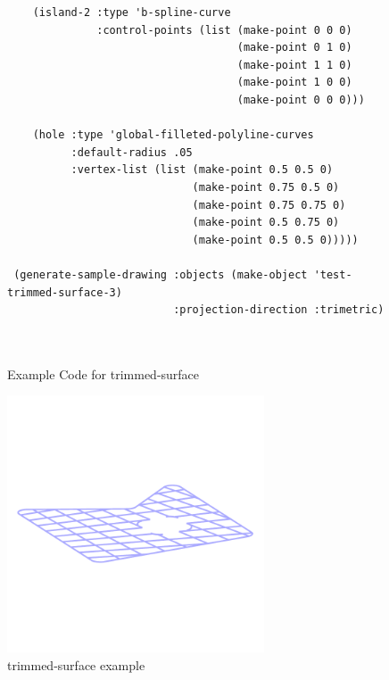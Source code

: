 \documentclass [11pt]{book}
\begin{document}
\begin{itemize}
\begin{figure}
\begin{lrbox}{\boxedverb}
\begin{minipage}{\linewidth}
{\begin{verbatim}
    (island-2 :type 'b-spline-curve 
              :control-points (list (make-point 0 0 0)
                                    (make-point 0 1 0)
                                    (make-point 1 1 0)
                                    (make-point 1 0 0)
                                    (make-point 0 0 0)))
   
    (hole :type 'global-filleted-polyline-curves
          :default-radius .05
          :vertex-list (list (make-point 0.5 0.5 0)
                             (make-point 0.75 0.5 0)
                             (make-point 0.75 0.75 0)
                             (make-point 0.5 0.75 0)
                             (make-point 0.5 0.5 0)))))

 (generate-sample-drawing :objects (make-object 'test-trimmed-surface-3)
                          :projection-direction :trimetric)



\end{verbatim}}
\end{minipage}
\end{lrbox}
\fbox{\usebox{\boxedverb}}

\caption{Example Code for trimmed-surface}

\label{fig:example-code-trimmed-surface}

\end{figure}

\begin{figure}
\begin{center}
\includegraphics[width=3in,height=3in]{../images/example-trimmed-surface.pdf}
\end{center}

\caption{trimmed-surface example}

\label{fig:trimmed-surface}


\end{figure}
\end{itemize}
\end{document}

